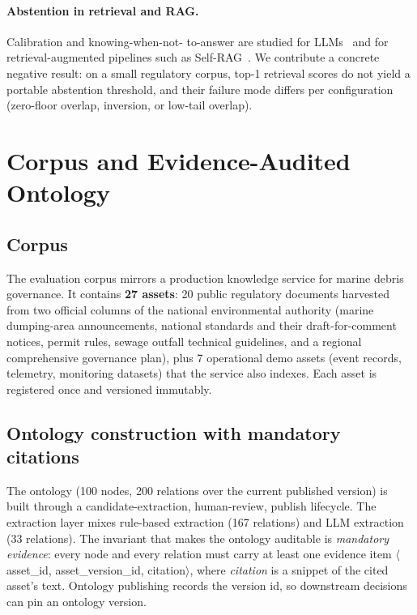 \documentclass[runningheads]{llncs}
\begin{document}
\paragraph{Abstention in retrieval and RAG.} Calibration and knowing-when-not-
to-answer are studied for LLMs~\cite{lmknow,kadavath} and for retrieval-augmented
pipelines such as Self-RAG~\cite{selfrag}. We contribute a concrete negative
result: on a small regulatory corpus, top-1 retrieval scores do not yield a
portable abstention threshold, and their failure mode differs per
configuration (zero-floor overlap, inversion, or low-tail overlap).

\section{Corpus and Evidence-Audited Ontology}
\label{sec:ontology}

\subsection{Corpus}
The evaluation corpus mirrors a production knowledge service for marine
debris governance. It contains \textbf{27 assets}: 20 public regulatory
documents harvested from two official columns of the national environmental
authority (marine dumping-area announcements, national standards and their
draft-for-comment notices, permit rules, sewage outfall technical guidelines,
and a regional comprehensive governance plan), plus 7 operational demo assets
(event records, telemetry, monitoring datasets) that the service also indexes.
Each asset is registered once and versioned immutably.

\subsection{Ontology construction with mandatory citations}
The ontology (100 nodes, 200 relations over the current published version) is
built through a candidate-extraction, human-review, publish lifecycle. The
extraction layer mixes rule-based extraction (167 relations) and LLM
extraction (33 relations). The invariant that makes the ontology auditable is
\emph{mandatory evidence}: every node and every relation must carry at least
one evidence item $\langle$asset\_id, asset\_version\_id, citation$\rangle$,
where \emph{citation} is a snippet of the cited asset's text. Ontology
publishing records the version id, so downstream decisions can pin an ontology
version.
\end{document}
